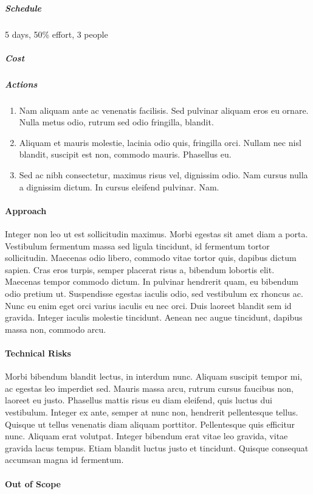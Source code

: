 			\subparagraph{Schedule} 5 days, 50\% effort, 3 people

			\subparagraph{Cost} 

			\subparagraph{Actions} 
				\begin{enumerate}
					\item Nam aliquam ante ac venenatis facilisis. Sed pulvinar aliquam eros eu ornare. Nulla metus odio, rutrum sed odio fringilla, blandit.
					\item Aliquam et mauris molestie, lacinia odio quis, fringilla orci. Nullam nec nisl blandit, suscipit est non, commodo mauris. Phasellus eu.
					\item Sed ac nibh consectetur, maximus risus vel, dignissim odio. Nam cursus nulla a dignissim dictum. In cursus eleifend pulvinar. Nam.
				\end{enumerate}

		\paragraph{Approach}
		Integer non leo ut est sollicitudin maximus. Morbi egestas sit amet diam a porta. Vestibulum fermentum massa sed ligula tincidunt, id fermentum tortor sollicitudin. Maecenas odio libero, commodo vitae tortor quis, dapibus dictum sapien. Cras eros turpis, semper placerat risus a, bibendum lobortis elit. Maecenas tempor commodo dictum. In pulvinar hendrerit quam, eu bibendum odio pretium ut. Suspendisse egestas iaculis odio, sed vestibulum ex rhoncus ac. Nunc eu enim eget orci varius iaculis eu nec orci. Duis laoreet blandit sem id gravida. Integer iaculis molestie tincidunt. Aenean nec augue tincidunt, dapibus massa non, commodo arcu.

		\paragraph{Technical Risks}
		Morbi bibendum blandit lectus, in interdum nunc. Aliquam suscipit tempor mi, ac egestas leo imperdiet sed. Mauris massa arcu, rutrum cursus faucibus non, laoreet eu justo. Phasellus mattis risus eu diam eleifend, quis luctus dui vestibulum. Integer ex ante, semper at nunc non, hendrerit pellentesque tellus. Quisque ut tellus venenatis diam aliquam porttitor. Pellentesque quis efficitur nunc. Aliquam erat volutpat. Integer bibendum erat vitae leo gravida, vitae gravida lacus tempus. Etiam blandit luctus justo et tincidunt. Quisque consequat accumsan magna id fermentum.

		\paragraph{Out of Scope}

